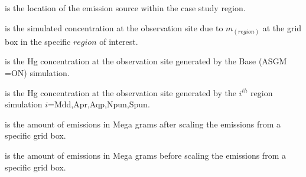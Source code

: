\begin{description}[leftmargin=!,labelwidth={5 em}]
    \item [$region$] is the location of the emission source within the case study region.
    \item [$Hg^0_{sig(region)}$] is the simulated \hg concentration at the observation site due to $m_{(region)}$ at the grid box in the specific $region $ of interest.
    \item [$Hg_{m_0}$] is the Hg concentration  at the observation site generated by the Base (ASGM =ON) simulation. 
    \item [$Hg_{m_1}$] is the Hg concentration  at the observation site generated by the $i^{th}$ region simulation $i$=Mdd,Apr,Aqp,Npun,Spun. 
    \item [$m_1$] is the amount of emissions in Mega grams after scaling the emissions from a specific grid box.
    \item [$m_0$] is the amount of emissions in Mega grams before scaling the emissions from a specific grid box.
\end{description}




    
    





